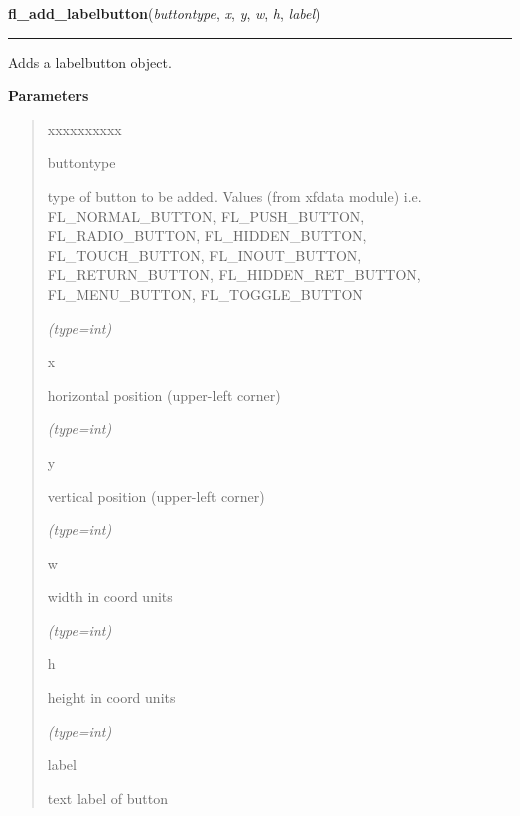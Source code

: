 \hspace{.8\funcindent}\begin{boxedminipage}{\funcwidth}

    \raggedright \textbf{fl\_add\_labelbutton}(\textit{buttontype}, \textit{x}, \textit{y}, \textit{w}, \textit{h}, \textit{label})

    \vspace{-1.5ex}

    \rule{\textwidth}{0.5\fboxrule}
\setlength{\parskip}{2ex}
    Adds a labelbutton object.

\setlength{\parskip}{1ex}
      \textbf{Parameters}
      \vspace{-1ex}

      \begin{quote}
        \begin{Ventry}{xxxxxxxxxx}

          \item[buttontype]

          type of button to be added. Values (from xfdata module) i.e. 
          FL\_NORMAL\_BUTTON, FL\_PUSH\_BUTTON, FL\_RADIO\_BUTTON, 
          FL\_HIDDEN\_BUTTON, FL\_TOUCH\_BUTTON, FL\_INOUT\_BUTTON, 
          FL\_RETURN\_BUTTON, FL\_HIDDEN\_RET\_BUTTON, FL\_MENU\_BUTTON, 
          FL\_TOGGLE\_BUTTON

            {\it (type=int)}

          \item[x]

          horizontal position (upper-left corner)

            {\it (type=int)}

          \item[y]

          vertical position (upper-left corner)

            {\it (type=int)}

          \item[w]

          width in coord units

            {\it (type=int)}

          \item[h]

          height in coord units

            {\it (type=int)}

          \item[label]

          text label of button


\end{Ventry}
\end{quote}
\end{boxedminipage}
